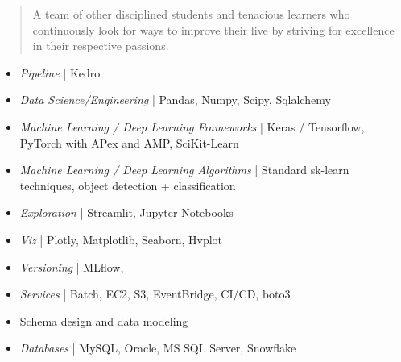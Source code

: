 \documentclass[10pt,a4paper,ragged2e,withhyper]{altacv}
\begin{document}
\begin{paracol}{2}
\switchcolumn


\begin{quote}
\justify
A team of other disciplined students and tenacious learners who continuously look for ways to improve their live by striving for excellence in their respective passions.
\end{quote}



\begin{itemize}
\item \textit{{\faStream} Pipeline} | Kedro 
\item \textit{{\faAtom} Data Science/Engineering} | Pandas, Numpy, Scipy, Sqlalchemy
\item \textit{{\faProjectDiagram} Machine Learning / Deep Learning Frameworks} | Keras / Tensorflow, PyTorch with APex and AMP, SciKit-Learn
\item \textit{{\faBrain} Machine Learning / Deep Learning Algorithms} | Standard sk-learn techniques, object detection + classification 
\item \textit{{\faEye} Exploration} | Streamlit, Jupyter Notebooks
\item \textit{{\faChartPie} Viz} | Plotly, Matplotlib, Seaborn, Hvplot
\item \textit{{\faCodeBranch} Versioning} | MLflow, \faGit

\end{itemize}


\begin{itemize}

\item \textit{{\faStream} Services} | Batch, EC2, S3, EventBridge, CI/CD, boto3

\end{itemize}

\begin{itemize}
\item Schema design and data modeling
\item \textit{Databases} | MySQL, Oracle, MS SQL Server, Snowflake
\end{itemize}


\end{paracol}
\end{document}
